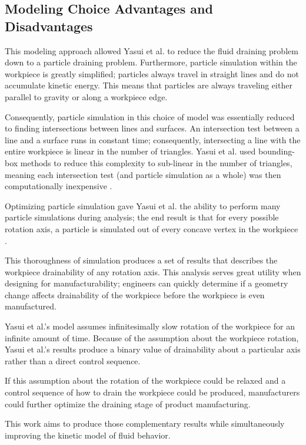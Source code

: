 	\subsection{Modeling Choice Advantages and Disadvantages}

This modeling approach allowed Yasui et al. to reduce the fluid draining problem down to a particle draining problem. Furthermore, particle simulation within the workpiece is greatly simplified; particles always travel in straight lines and do not accumulate kinetic energy. This means that particles are always traveling either parallel to gravity or along a workpiece edge.

Consequently, particle simulation in this choice of model was essentially reduced to finding intersections between lines and surfaces. An intersection test between a line and a surface runs in constant time; consequently, intersecting a line with the entire workpiece is linear in the number of triangles. Yasui et al. used bounding-box methods to reduce this complexity to sub-linear in the number of triangles, meaning each intersection test (and particle simulation as a whole) was then computationally inexpensive \cite{Yasui2011}.

Optimizing particle simulation gave Yasui et al. the ability to perform many particle simulations during analysis; the end result is that for every possible rotation axis, a particle is simulated out of every concave vertex in the workpiece \cite{Yasui2011}.

This thoroughness of simulation produces a set of results that describes the workpiece drainability of any rotation axis. This analysis serves great utility when designing for manufacturability; engineers can quickly determine if a geometry change affects drainability of the workpiece before the workpiece is even manufactured.

Yasui et al.'s model assumes infinitesimally slow rotation of the workpiece for an infinite amount of time. Because of the assumption about the workpiece rotation, Yasui et al.'s results produce a binary value of drainability about a particular axis rather than a direct control sequence.

If this assumption about the rotation of the workpiece could be relaxed and a  control sequence of how to drain the workpiece could be produced, manufacturers could further optimize the draining stage of product manufacturing.

This work aims to produce those complementary results while simultaneously improving the kinetic model of fluid behavior.

